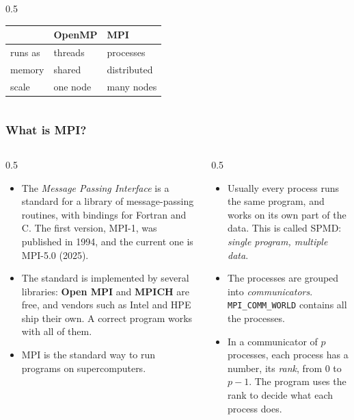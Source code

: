\begin{frame}
\begin{columns}[T]
\begin{column}{0.5\textwidth}
      \vspace*{1mm}
      \footnotesize
      \begin{tabular}{lll}
        & \textbf{OpenMP} & \textbf{MPI} \\
        \hline
        runs as & threads   & processes \\
        memory  & shared    & distributed \\
        scale   & one node  & many nodes \\
        \hline
      \end{tabular}
    \end{column}
  \end{columns}
\end{frame}


\begin{frame}
  \frametitle{What is MPI?}
  \begin{columns}[T]
    \begin{column}{0.5\textwidth}
      \begin{itemize}
        \item The \emph{Message Passing Interface} is a standard for a library of message-passing routines, with bindings for Fortran and C. The first version, MPI-1, was published in 1994, and the current one is MPI-5.0 (2025).
        \item The standard is implemented by several libraries: \textbf{Open MPI} and \textbf{MPICH} are free, and vendors such as Intel and HPE ship their own. A correct program works with all of them.
        \item MPI is the standard way to run programs on supercomputers.
      \end{itemize}
    \end{column}

    \begin{column}{0.5\textwidth}
      \begin{itemize}
        \item Usually every process runs the same program, and works on its own part of the data. This is called SPMD: \emph{single program, multiple data}.
        \item The processes are grouped into \emph{communicators}. \texttt{MPI\_COMM\_WORLD} contains all the processes.
        \item In a communicator of $p$ processes, each process has a number, its \emph{rank}, from 0 to $p - 1$. The program uses the rank to decide what each process does.
      \end{itemize}
    \end{column}
  \end{columns}
\end{frame}


